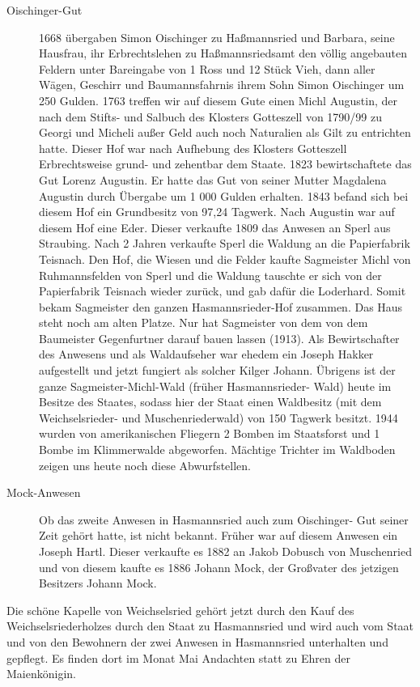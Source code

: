 \documentclass{book}
\begin{document}
\begin{description}
\item[Oischinger-Gut] 1668 übergaben Simon Oischinger zu Haßmannsried
und Barbara, seine Hausfrau, ihr Erbrechtslehen zu Haßmannsriedsamt den
völlig angebauten Feldern unter Bareingabe von 1 Ross und 12 Stück Vieh,
dann aller Wägen, Geschirr und Baumannsfahrnis ihrem Sohn Simon
Oischinger um 250 Gulden. 1763 treffen wir auf diesem Gute einen Michl
Augustin, der nach dem Stifts- und Salbuch des Klosters Gotteszell von
1790/99 zu Georgi und Micheli außer Geld auch noch Naturalien als Gilt
zu entrichten hatte. Dieser Hof war nach Aufhebung des Klosters
Gotteszell Erbrechtsweise grund- und zehentbar dem Staate. 1823
bewirtschaftete das Gut Lorenz Augustin. Er hatte das Gut von seiner
Mutter Magdalena Augustin durch Übergabe um 1 000 Gulden erhalten. 1843
befand sich bei diesem Hof ein Grundbesitz von 97,24 Tagwerk. Nach
Augustin war auf diesem Hof eine Eder. Dieser verkaufte 1809 das Anwesen
an Sperl aus Straubing. Nach 2 Jahren verkaufte Sperl die Waldung an die
Papierfabrik Teisnach. Den Hof, die Wiesen und die Felder kaufte
Sagmeister Michl von Ruhmannsfelden von Sperl und die Waldung tauschte
er sich von der Papierfabrik Teisnach wieder zurück, und gab dafür die
Loderhard. Somit bekam Sagmeister den ganzen Hasmannsrieder-Hof
zusammen. Das Haus steht noch am alten Platze. Nur hat Sagmeister von
dem von dem Baumeister Gegenfurtner darauf bauen lassen (1913). Als
Bewirtschafter des Anwesens und als Waldaufseher war ehedem ein Joseph
Hakker aufgestellt und jetzt fungiert als solcher Kilger Johann.
Übrigens ist der ganze Sagmeister-Michl-Wald (früher Hasmannsrieder-
Wald) heute im Besitze des Staates, sodass hier der Staat einen
Waldbesitz (mit dem Weichselsrieder- und Muschenriederwald) von 150
Tagwerk besitzt. 1944 wurden von amerikanischen Fliegern 2 Bomben im
Staatsforst und 1 Bombe im Klimmerwalde abgeworfen. Mächtige Trichter im
Waldboden zeigen uns heute noch diese Abwurfstellen.

\item[Mock-Anwesen] Ob das zweite Anwesen in Hasmannsried auch zum
Oischinger- Gut seiner Zeit gehört hatte, ist nicht bekannt. Früher war
auf diesem Anwesen ein Joseph Hartl. Dieser verkaufte es 1882 an Jakob
Dobusch von Muschenried und von diesem kaufte es 1886 Johann Mock, der
Großvater des jetzigen Besitzers Johann Mock.
\end{description}

Die schöne Kapelle von Weichselsried gehört jetzt durch den Kauf des
Weichselsriederholzes durch den Staat zu Hasmannsried und wird auch vom
Staat und von den Bewohnern der zwei Anwesen in Hasmannsried unterhalten
und gepflegt. Es finden dort im Monat Mai Andachten statt zu Ehren der
Maienkönigin.
\end{document}
